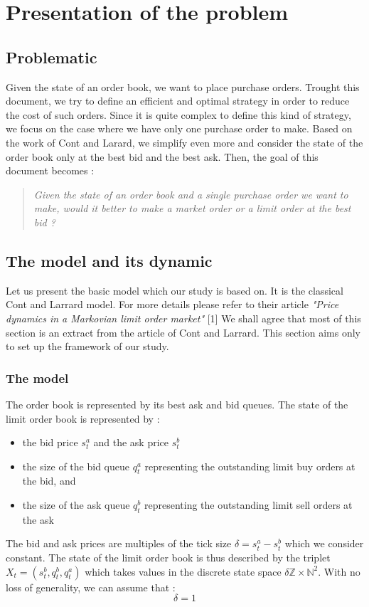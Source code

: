 \documentclass{article}
\begin{document}
\section{Presentation of the problem}

\subsection{Problematic}
Given the state of an order book, we want to place purchase orders. Trought this document, we try to define an efficient and optimal strategy in order to reduce the cost of such orders. Since it is quite complex to define this kind of strategy, we focus on the case where we have only one purchase order to make. Based on the work of Cont and Larard, we simplify even more and consider the state of the order book only at the best bid and the best ask. Then, the goal of this document becomes :
\begin{quote}
\textit{Given the state of an order book and a single purchase order we want to make, would it better to make a market order or a limit order at the best bid ?}
\end{quote}


\subsection{The model and its dynamic}
Let us present the basic model which our study is based on. It is the classical Cont and Larrard model. For more details please refer to their article \textit{"Price dynamics in a Markovian limit order market"} [1]
\newline
We shall agree that most of this section is an extract from the article of Cont and Larrard. This section aims only to set up the framework of our study.
\subsubsection{The model}
The order book is represented by its best ask and bid queues. The state of the limit order book is represented by :
\begin{itemize}
\item the bid price $ s_{t}^{a} $ and the ask price $ s_{t}^{b} $ 
\item the size of the bid queue $ q_{t}^{a} $ representing the outstanding limit buy orders at the bid, and 
\item the size of the ask queue $ q_{t}^{b} $ representing the outstanding limit sell orders at the ask 
\end{itemize}
The bid and ask prices are multiples of the tick size $\delta = s_{t}^{a} - s_{t}^{b}$ which we consider constant.
The state of the limit order book is thus described by the triplet $X_{t} = (s_{t}^{b}, q_{t}^{b}, q_{t}^{a})$ which takes values in the discrete state space $\delta \mathbb{Z} \times \mathbb{N}^{2} $. With no loss of generality, we can assume that  :
\begin{equation}
\delta = 1
\end{equation}
\end{document}
